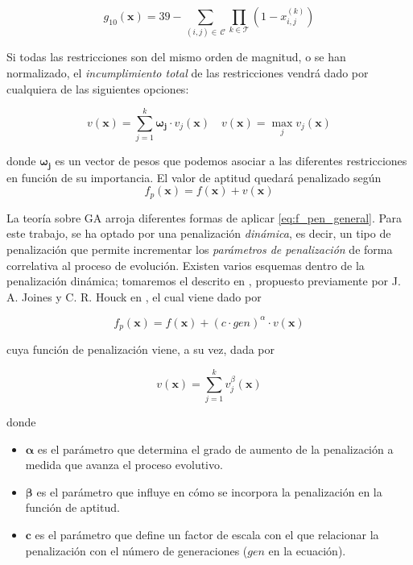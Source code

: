 \documentclass[12pt,a4paper]{book}
\begin{document}
\begin{equation}
g_{10}(\mathbf{x}) = 39 - \sum_{(i,j)\in \, \mathcal{C}} \prod_{k \in \mathcal{T}} (1-x_{i,j}^{(k)})   \label{eq:g_j_vacias}
\end{equation}

Si todas las restricciones son del mismo orden de magnitud, o se han normalizado, el \textsl{incumplimiento total} de las restricciones vendrá dado por cualquiera de las siguientes opciones: 

\begin{equation}
v(\mathbf{x}) = \sum_{j=1}^k \mathbf{\omega_j} \cdot v_j (\mathbf{x}) \quad v(\mathbf{x}) = \max_{j} v_j (\mathbf{x})
\label{eq: violacion_sum_max}
\end{equation} 

donde $\mathbf{\omega_j}$ es un vector de pesos que podemos asociar a las diferentes restricciones en función de su importancia. El valor de aptitud quedará penalizado según
\begin{equation}
f_p(\mathbf{x}) = f(\mathbf{x})+ v(\mathbf{x}) 
 \label{eq:f_pen_general}
\end{equation}

La teoría sobre GA arroja diferentes formas de aplicar \ref{eq:f_pen_general}. Para este trabajo, se ha optado por una penalización \textsl{dinámica}, es decir, un tipo de penalización que permite incrementar los \textsl{parámetros de penalización} de forma correlativa al proceso de evolución. Existen varios esquemas dentro de la penalización dinámica; tomaremos el descrito en \cite{yu_introduction_2010}, propuesto previamente por J. A. Joines y C. R. Houck  en \cite{joines_use_1994}, el cual viene dado por 
   
\begin{equation}
f_p(\mathbf{x}) = f(\mathbf{x})+(c \cdot \mathit{gen})^{\alpha} \cdot v(\mathbf{x})
\end{equation} \label{eq:Joines&Houck}   

cuya función de penalización viene, a su vez, dada por 
 
\begin{equation}
v(\mathbf{x}) = \sum_{j=1}^k v_j^{\beta}(\mathbf{x})
\end{equation}\label{eq:pen_JH}

donde 
\begin{itemize}
	\item $\bm{\alpha} $ es el parámetro que determina el grado de aumento de la penalización a medida que avanza el proceso evolutivo.
	\item $\bm{\beta}$ es el parámetro que influye en cómo se incorpora la penalización en la función de aptitud.
	\item $\mathbf{c}$ es el parámetro que define un factor de escala con el que relacionar la penalización con el número de generaciones ($\mathit{gen}$ en la ecuación).
\end{itemize}
\end{document}
